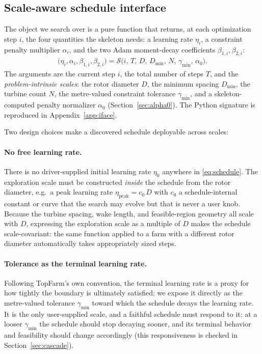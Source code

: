 \documentclass[11pt]{article}
\newcommand{\gm}{\gamma_{\min}}
\newcommand{\Dmin}{D_{\min}}
\begin{document}
\subsection{Scale-aware schedule interface}
\label{sec:interface}
The object we search over is a pure function that returns, at each optimization step
$i$, the four quantities the skeleton needs: a learning rate $\eta_i$, a constraint
penalty multiplier $\alpha_i$, and the two Adam moment-decay coefficients
$\beta_{1,i},\beta_{2,i}$:
\begin{align}
\big(\eta_i,\alpha_i,\beta_{1,i},\beta_{2,i}\big)
= \mathcal{S}\big(i,\,T,\,D,\,\Dmin,\,N,\,\gm,\,\alpha_0\big).
\label{eq:schedule}
\end{align}
The arguments are the current step $i$, the total number of steps $T$, and the
\emph{problem-intrinsic scales}: the rotor diameter $D$, the minimum spacing $\Dmin$,
the turbine count $N$, the metre-valued constraint tolerance $\gm$, and a
skeleton-computed penalty normalizer $\alpha_0$ (Section~\ref{sec:alpha0}). The
Python signature is reproduced in Appendix~\ref{app:iface}.

Two design choices make a discovered schedule deployable across scales:

\paragraph{No free learning rate.} There is no driver-supplied initial learning rate
$\eta_0$ anywhere in \cref{eq:schedule}. The exploration scale must be constructed
\emph{inside} the schedule from the rotor diameter, e.g.\ a peak learning rate
$\eta_{\text{peak}} = c_0\,D$ with $c_0$ a schedule-internal constant or curve that the
search may evolve but that is never a user knob. Because the turbine spacing, wake
length, and feasible-region geometry all scale with $D$, expressing the exploration
scale as a multiple of $D$ makes the schedule scale-covariant: the same function
applied to a farm with a different rotor diameter automatically takes appropriately
sized steps.

\paragraph{Tolerance as the terminal learning rate.} Following TopFarm's own
convention, the terminal learning rate is a proxy for how tightly the boundary is
ultimately satisfied; we expose it directly as the metre-valued tolerance $\gm$
toward which the schedule decays the learning rate. It is the only user-supplied
scale, and a faithful schedule must respond to it: at a looser $\gm$ the schedule
should stop decaying sooner, and its terminal behavior and feasibility should change
accordingly (this responsiveness is checked in Section~\ref{sec:cascade}).
\end{document}
